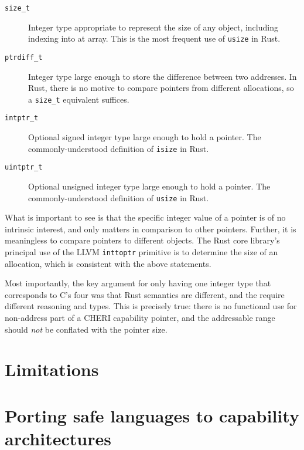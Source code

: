 \documentclass[dissertation.tex]{subfiles}
\begin{document}
\begin{description}
    \item[\texttt{size\_t}] Integer type appropriate to represent the
    size of any object, including indexing into at array.
    This is the most frequent use of \texttt{usize} in Rust.
    \item[\texttt{ptrdiff\_t}] Integer type large enough to store the
    difference between two addresses. In Rust, there is no motive to
    compare pointers from different allocations, so a \texttt{size\_t}
    equivalent suffices.
    \item[\texttt{intptr\_t}] Optional signed integer type large enough to hold
    a pointer. The commonly-understood definition of \texttt{isize} in Rust.
    \item[\texttt{uintptr\_t}] Optional unsigned integer type large enough to hold
    a pointer. The commonly-understood definition of \texttt{usize} in Rust.
\end{description}

What is important to see is that the specific integer value of a pointer
is of no intrinsic interest, and only matters in comparison to other
pointers.
Further, it is meaningless to compare pointers to different objects.
The Rust core library's principal use of the LLVM \texttt{inttoptr}
primitive is to determine the size of an allocation, which is consistent
with the above statements.

Most importantly, the key argument for only having one integer type that
corresponds to C's four was that Rust semantics are different, and the
require different reasoning and types.
This is precisely true: there is no functional use for non-address part
of a CHERI capability pointer, and the addressable range should
\emph{not} be conflated with the pointer size.


\section{Limitations}


\section{Porting safe languages to capability architectures}
\label{sec:eval-porting}
\end{document}
